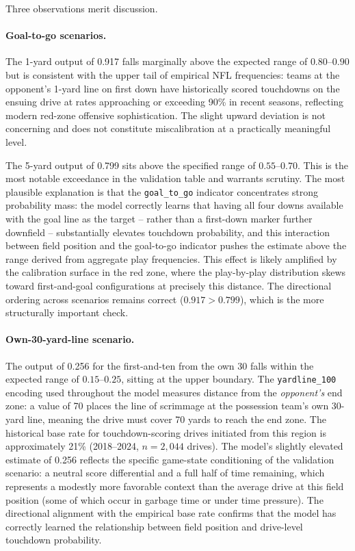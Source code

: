 Three observations merit discussion.

\paragraph{Goal-to-go scenarios.}
The 1-yard output of 0.917 falls marginally above the expected range of
$0.80$--$0.90$ but is consistent with the upper tail of empirical NFL
frequencies: teams at the opponent's 1-yard line on first down have
historically scored touchdowns on the ensuing drive at rates approaching or
exceeding 90\% in recent seasons, reflecting modern red-zone offensive
sophistication. The slight upward deviation is not concerning and does not
constitute miscalibration at a practically meaningful level.

The 5-yard output of 0.799 sits above the specified range of $0.55$--$0.70$.
This is the most notable exceedance in the validation table and warrants
scrutiny. The most plausible explanation is that the \texttt{goal\_to\_go}
indicator concentrates strong probability mass: the model correctly learns
that having all four downs available with the goal line as the target -- rather
than a first-down marker further downfield -- substantially elevates touchdown
probability, and this interaction between field position and the goal-to-go
indicator pushes the estimate above the range derived from aggregate play
frequencies. This effect is likely amplified by the calibration surface in
the red zone, where the play-by-play distribution skews toward first-and-goal
configurations at precisely this distance. The directional ordering across
scenarios remains correct ($0.917 > 0.799$), which is the more structurally
important check.

\paragraph{Own-30-yard-line scenario.}
The output of 0.256 for the first-and-ten from the own 30 falls within the
expected range of $0.15$--$0.25$, sitting at the upper boundary. The
\texttt{yardline\_100} encoding used throughout the model measures distance
from the \emph{opponent's} end zone: a value of 70 places the line of
scrimmage at the possession team's own 30-yard line, meaning the drive must
cover 70 yards to reach the end zone. The historical base rate for
touchdown-scoring drives initiated from this region is approximately 21\%
(2018--2024, $n = 2{,}044$ drives). The model's slightly elevated estimate
of 0.256 reflects the specific game-state conditioning of the validation
scenario: a neutral score differential and a full half of time remaining,
which represents a modestly more favorable context than the average drive at
this field position (some of which occur in garbage time or under time
pressure). The directional alignment with the empirical base rate confirms
that the model has correctly learned the relationship between field position
and drive-level touchdown probability.

